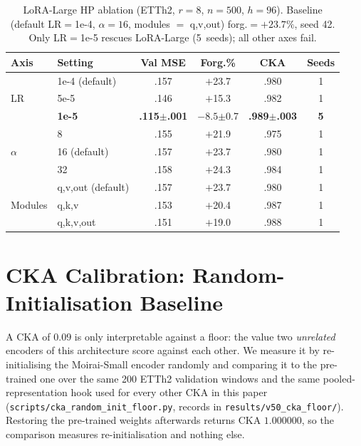 \begin{table}[ht]
\centering
\caption{LoRA-Large HP ablation (ETTh2, $r{=}8$, $n{=}500$, $h{=}96$).
Baseline (default LR$=$1e-4, $\alpha{=}16$, modules $=$ q,v,out) forg.$=+23.7\%$, seed 42.
Only LR$=$1e-5 rescues LoRA-Large (5~seeds); all other axes fail.}
\label{tab:lora_large_hp}
\small
\begin{tabular}{llcccc}
\toprule
Axis & Setting & Val MSE & Forg.\% & CKA & Seeds \\
\midrule
\multirow{3}{*}{LR} & 1e-4 (default) & .157 & $+$23.7 & .980 & 1 \\
                    & 5e-5           & .146 & $+$15.3 & .982 & 1 \\
                    & \textbf{1e-5}  & \textbf{.115{\tiny$\pm$.001}} & $\mathbf{-8.5}${\tiny$\pm$0.7} & \textbf{.989{\tiny$\pm$.003}} & \textbf{5} \\
\midrule
\multirow{3}{*}{$\alpha$} & 8  & .155 & $+$21.9 & .975 & 1 \\
                           & 16 (default) & .157 & $+$23.7 & .980 & 1 \\
                           & 32 & .158 & $+$24.3 & .984 & 1 \\
\midrule
\multirow{3}{*}{Modules} & q,v,out (default)  & .157 & $+$23.7 & .980 & 1 \\
                         & q,k,v              & .153 & $+$20.4 & .987 & 1 \\
                         & q,k,v,out          & .151 & $+$19.0 & .988 & 1 \\
\bottomrule
\end{tabular}
\end{table}

\section{CKA Calibration: Random-Initialisation Baseline}
\label{app:cka_calibration}

A CKA of $0.09$ is only interpretable against a floor: the value two
\emph{unrelated} encoders of this architecture score against each other.  We
measure it by re-initialising the Moirai-Small encoder randomly and comparing it
to the pre-trained one over the same 200 ETTh2 validation windows and the same
pooled-representation hook used for every other CKA in this paper
(\texttt{scripts/cka\_random\_init\_floor.py}, records in
\texttt{results/v50\_cka\_floor/}).  Restoring the pre-trained weights afterwards
returns CKA $1.000000$, so the comparison measures re-initialisation and nothing
else.

